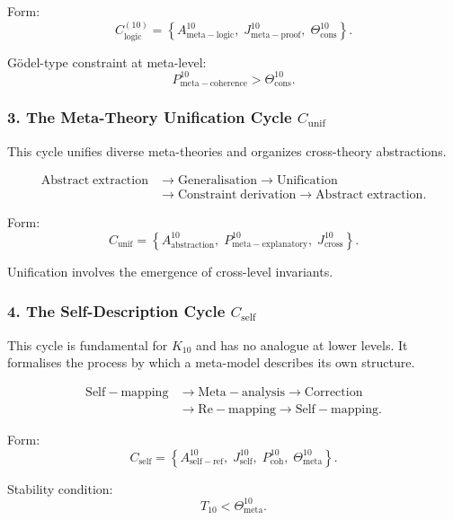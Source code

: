 Form:
\[
  C_{\mathrm{logic}}^{(10)}
   =
   \left\{
     A^{10}_{\mathrm{meta\!-\!logic}},\;
     J^{10}_{\mathrm{meta\!-\!proof}},\;
     \Theta^{10}_{\mathrm{cons}}
   \right\}.
\]

Gödel-type constraint at meta-level:
\[
  P^{10}_{\mathrm{meta\!-\!coherence}}
    >
  \Theta^{10}_{\mathrm{cons}}.
\]


\subsubsection{3. The Meta-Theory Unification Cycle $C_{\mathrm{unif}}$}

This cycle unifies diverse meta-theories and organizes cross-theory
abstractions.

\[
  \begin{aligned}
  \mathrm{Abstract\;extraction}
  &\to \mathrm{Generalisation}
  \to \mathrm{Unification}\\
  &\to \mathrm{Constraint\;derivation}
  \to \mathrm{Abstract\;extraction}.
  \end{aligned}
\]

Form:
\[
  C_{\mathrm{unif}}
    =
    \left\{
      A^{10}_{\mathrm{abstraction}},\;
      P^{10}_{\mathrm{meta\!-\!explanatory}},\;
      J^{10}_{\mathrm{cross}}
    \right\}.
\]

Unification involves the emergence of cross-level invariants.


\subsubsection{4. The Self-Description Cycle $C_{\mathrm{self}}$}

This cycle is fundamental for $K_{10}$ and has no analogue at lower levels.
It formalises the process by which a meta-model describes its own structure.

\[
  \begin{aligned}
  \mathrm{Self\!-\!mapping}
  &\to \mathrm{Meta\!-\!analysis}
  \to \mathrm{Correction}\\
  &\to \mathrm{Re\!-\!mapping}
  \to \mathrm{Self\!-\!mapping}.
  \end{aligned}
\]

Form:
\[
  C_{\mathrm{self}}
    =
    \left\{
      A^{10}_{\mathrm{self\!-\!ref}},\;
      J^{10}_{\mathrm{self}},\;
      P^{10}_{\mathrm{coh}},\;
      \Theta^{10}_{\mathrm{meta}}
    \right\}.
\]

Stability condition:
\[
  T_{10} < \Theta^{10}_{\mathrm{meta}}.
\]


